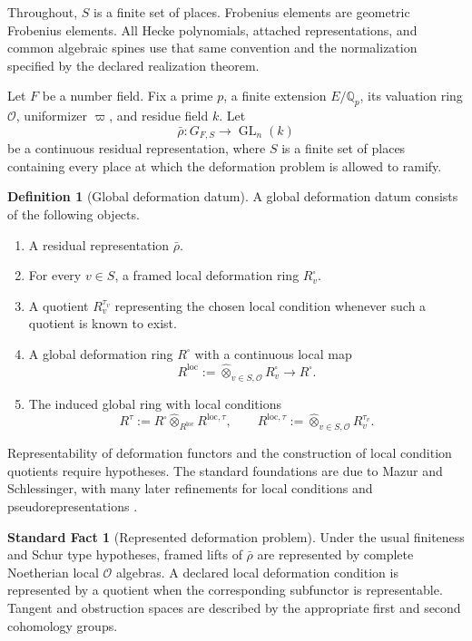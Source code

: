 \documentclass[11pt]{amsart}
\theoremstyle{definition}
\newtheorem{definition}[definition]{Definition}
\newtheorem{standardfact}[standardfact]{Standard Fact}
\theoremstyle{remark}
\newcommand{\OO}{\mathcal O}
\newcommand{\QQ}{\mathbb Q}
\newcommand{\GL}{\operatorname{GL}}
\newcommand{\wideotimes}{\mathbin{\widehat\otimes}}
\begin{document}
Throughout, \(S\) is a finite set of places. Frobenius elements are geometric Frobenius elements. All Hecke polynomials, attached representations, and common algebraic spines use that same convention and the normalization specified by the declared realization theorem.


Let \(F\) be a number field. Fix a prime \(p\), a finite extension \(E/\QQ_p\), its valuation ring \(\OO\), uniformizer \(\varpi\), and residue field \(k\). Let
\[
\bar\rho:G_{F,S}\longrightarrow\GL_n(k)
\]
be a continuous residual representation, where \(S\) is a finite set of places containing every place at which the deformation problem is allowed to ramify.

\begin{definition}[Global deformation datum]\label{def:global_datum}
A global deformation datum consists of the following objects.
\begin{enumerate}
\item A residual representation \(\bar\rho\).
\item For every \(v\in S\), a framed local deformation ring \(R_v^\square\).
\item A quotient \(R_v^{\tau_v}\) representing the chosen local condition whenever such a quotient is known to exist.
\item A global deformation ring \(R^\square\) with a continuous local map
\[
R^{\mathrm{loc}}:=\wideotimes_{v\in S,\OO}R_v^\square
\longrightarrow R^\square.
\]
\item The induced global ring with local conditions
\[
R^{\tau}:=R^\square\wideotimes_{R^{\mathrm{loc}}}R^{\mathrm{loc},\tau},
\qquad
R^{\mathrm{loc},\tau}:=\wideotimes_{v\in S,\OO}R_v^{\tau_v}.
\]
\end{enumerate}
\end{definition}

Representability of deformation functors and the construction of local condition quotients require hypotheses. The standard foundations are due to Mazur and Schlessinger, with many later refinements for local conditions and pseudorepresentations \cite{Mazur1989,Schlessinger1968,BellaicheChenevier2009}.

\begin{standardfact}[Represented deformation problem]\label{fact:represented_deformation}
Under the usual finiteness and Schur type hypotheses, framed lifts of \(\bar\rho\) are represented by complete Noetherian local \(\OO\) algebras. A declared local deformation condition is represented by a quotient when the corresponding subfunctor is representable. Tangent and obstruction spaces are described by the appropriate first and second cohomology groups.
\end{standardfact}
\end{document}
